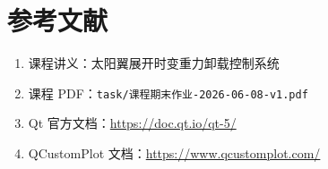 \documentclass[UTF8, a4paper, fontset=none]{ctexart}
\begin{document}
\section{参考文献}

\begin{enumerate}[leftmargin=*]
  \item 课程讲义：太阳翼展开时变重力卸载控制系统
  \item 课程 PDF：\texttt{task/课程期末作业-2026-06-08-v1.pdf}
  \item Qt 官方文档：\url{https://doc.qt.io/qt-5/}
  \item QCustomPlot 文档：\url{https://www.qcustomplot.com/}
\end{enumerate}
\end{document}
